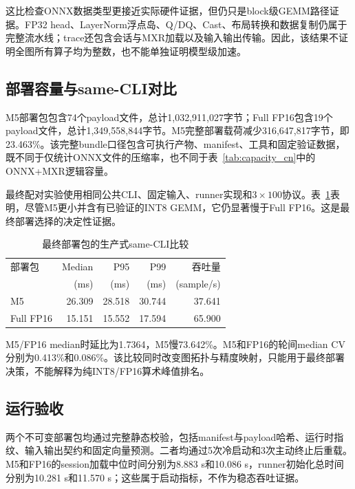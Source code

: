 \documentclass[conference]{IEEEtran}
\begin{document}
这比检查ONNX数据类型更接近实际硬件证据，但仍只是block级GEMM路径证据。FP32 head、LayerNorm浮点岛、Q/DQ、Cast、布局转换和数据复制仍属于完整流水线；trace还包含会话与MXR加载以及输入输出传输。因此，该结果不证明全图所有算子均为整数，也不能单独证明模型级加速。

\subsection{部署容量与same-CLI对比}

M5部署包包含74个payload文件，总计1,032,911,027字节；Full FP16包含19个payload文件，总计1,349,558,844字节。M5完整部署载荷减少316,647,817字节，即23.463\%。该完整bundle口径包含可执行产物、manifest、工具和固定验证数据，既不同于仅统计ONNX文件的压缩率，也不同于表~\ref{tab:capacity_cn}中的ONNX+MXR逻辑容量。

最终配对实验使用相同公共CLI、固定输入、runner实现和$3\times100$协议。表~\ref{tab:cli_cn}表明，尽管M5更小并含有已验证的INT8 GEMM，它仍显著慢于Full FP16。这是最终部署选择的决定性证据。

\begin{table}[t]
\caption{最终部署包的生产式same-CLI比较}
\label{tab:cli_cn}
\centering
\footnotesize
\begin{tabular}{lrrrr}
\toprule
部署包 & Median & P95 & P99 & 吞吐量 \\
 & (ms) & (ms) & (ms) & (sample/s) \\
\midrule
M5 & 26.309 & 28.518 & 30.744 & 37.641 \\
Full FP16 & 15.151 & 15.552 & 17.594 & 65.900 \\
\bottomrule
\end{tabular}
\vspace{2pt}
\parbox{0.96\columnwidth}{\footnotesize M5/FP16 median时延比为1.7364，M5慢73.642\%。M5和FP16的轮间median CV分别为0.413\%和0.086\%。该比较同时改变图拓扑与精度映射，只能用于最终部署决策，不能解释为纯INT8/FP16算术峰值排名。}
\end{table}

\subsection{运行验收}

两个不可变部署包均通过完整静态校验，包括manifest与payload哈希、运行时指纹、输入输出契约和固定向量预测。二者均通过5次冷启动和3次主动终止后重载。M5和FP16的session加载中位时间分别为8.883 s和10.086 s，runner初始化总时间分别为10.281 s和11.570 s；这些属于启动指标，不作为稳态吞吐证据。
\end{document}
